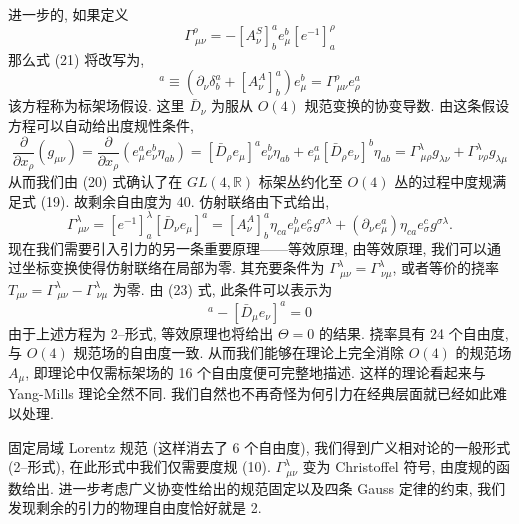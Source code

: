 \documentclass{article}
\begin{document}
进一步的, 如果定义
\begin{equation}
\Gamma_{\ \mu\nu}^{\rho}=-[A^{S}_{\nu}]^{a}_{b}e_{\mu}^{b}[e^{-1}]^{\rho}_{a}
\end{equation}
那么式 (21) 将改写为,
\begin{equation}
[\bar{D}_{\nu}e_{\mu}]^{a}\equiv (\partial_{\nu}\delta_{b}^{a}+[A_{\nu}^{A}]^{a}_{b})e_{\mu}^{b}=\Gamma^{\rho}_{\ \mu\nu}e_{\rho}^{a}
\end{equation}
该方程称为标架场假设. 这里 $\bar{D}_{\nu}$ 为服从 $O(4)$ 规范变换的协变导数. 由这条假设方程可以自动给出度规性条件,
\begin{equation}
\frac{\partial }{\partial x_{\rho}}(g_{\mu\nu})=\frac{\partial }{\partial x_{\rho}}(e_{\mu}^{a}e_{\nu}^{b}\eta_{ab})=[\bar{D}_{\rho}e_{\mu}]^{a}e_{\nu}^{b}\eta_{ab}+e_{\mu}^{a}[\bar{D}_{\rho}e_{\nu}]^{b}\eta_{ab}=\Gamma^{\lambda}_{\ \mu\rho}g_{\lambda\nu}+\Gamma^{\lambda}_{\ \nu\rho}g_{\lambda\mu}
\end{equation}
从而我们由 (20) 式确认了在 $GL(4,\mathbb{R})$ 标架丛约化至 $O(4)$ 丛的过程中度规满足式 (19). 故剩余自由度为 40. 仿射联络由下式给出,
\begin{equation}
\Gamma_{\ \mu\nu}^{\lambda}=[e^{-1}]^{\lambda}_{a}[\bar{D}_{\nu}e_{\mu}]^{a}=[A_{\nu}^{A}]_{b}^{a}\eta_{ca}e_{\mu}^{b}e_{\sigma}^{c}g^{\sigma\lambda}+(\partial_{\nu}e_{\mu}^{a})\eta_{ca}e_{\sigma}^{c}g^{\sigma\lambda}.
\end{equation}
现在我们需要引入引力的另一条重要原理——等效原理, 由等效原理, 我们可以通过坐标变换使得仿射联络在局部为零. 其充要条件为 $\Gamma_{\ \mu\nu}^{\lambda}=\Gamma_{\ \nu\mu}^{\lambda}$, 或者等价的挠率 $T_{\mu\nu}=\Gamma_{\ \mu\nu}^{\lambda}-\Gamma_{\ \nu\mu}^{\lambda}$ 为零. 由 (23) 式, 此条件可以表示为
\begin{equation}
[\bar{D}_{\nu}e_{\mu}]^{a}-[\bar{D}_{\mu}e_{\nu}]^{a}=0
\end{equation}
由于上述方程为 2--形式, 等效原理也将给出 $\Theta=0$ 的结果. 挠率具有 24 个自由度, 与 $O(4)$ 规范场的自由度一致. 从而我们能够在理论上完全消除 $O(4)$ 的规范场 $A_{\mu}$, 即理论中仅需标架场的 16 个自由度便可完整地描述. 这样的理论看起来与 Yang-Mills 理论全然不同. 我们自然也不再奇怪为何引力在经典层面就已经如此难以处理.

固定局域 Lorentz 规范 (这样消去了 6 个自由度), 我们得到广义相对论的一般形式 (2--形式), 在此形式中我们仅需要度规 (10). $\Gamma_{\ \mu\nu}^{\lambda}$ 变为 Christoffel 符号, 由度规的函数给出. 进一步考虑广义协变性给出的规范固定以及四条 Gauss 定律的约束, 我们发现剩余的引力的物理自由度恰好就是 2.
\end{document}

